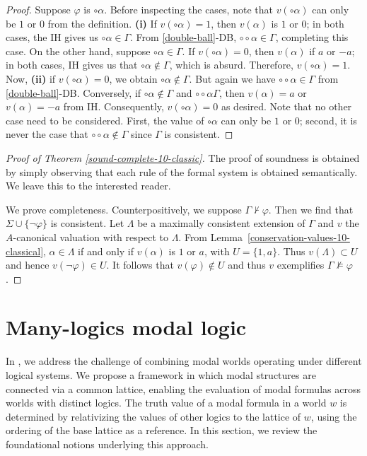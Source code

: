\documentclass{amsart}
\begin{document}
\begin{proof}
    Suppose $\varphi$ is $\circ \alpha$. Before inspecting the cases, note that $v(\circ \alpha)$ can only be $1$ or $0$ from the definition.
    \textbf{(i)} If $v(\circ \alpha) = 1$, then $v(\alpha)$ is $1$ or $0$; in both cases, the IH gives us $\circ \alpha \in \Gamma$. From \ref{double-ball}-DB, $\circ \circ \alpha \in \Gamma$, completing this case. On the other hand, suppose $\circ \alpha \in \Gamma$. If $v(\circ \alpha) = 0$, then $v(\alpha)$ if $a$ or $-a$; in both cases, IH gives us that $\circ \alpha \notin \Gamma$, which is absurd. Therefore, $v(\circ \alpha) = 1$. Now, \textbf{(ii)} if $v(\circ \alpha) = 0$, we obtain $\circ \alpha \notin \Gamma$. But again we have $\circ \circ \alpha \in \Gamma$ from \ref{double-ball}-DB. Conversely, if $\circ \alpha \notin \Gamma$ and $\circ \circ \alpha \Gamma$, then $v(\alpha) = a$ or $v(\alpha) = -a$ from IH. Consequently, $v(\circ \alpha) = 0$ as desired. Note that no other case need to be considered. First, the value of $\circ \alpha$ can only be $1$ or $0$; second, it is never the case that $\circ \circ \alpha \notin \Gamma$ since $\Gamma$ is consistent.
\end{proof}

\begin{proof}[Proof of Theorem \ref{sound-complete-10-classic}]
    The proof of soundness is obtained by simply observing that each rule of the formal system is obtained semantically. We leave this to the interested reader.
    
    We prove completeness. Counterpositively, we suppose $\Gamma \nvdash \varphi$. Then we find that $\Sigma \cup \{\lnot \varphi\}$ is consistent. Let $\Lambda$ be a maximally consistent extension of $\Gamma$ and $v$ the $A$-canonical valuation with respect to $\Lambda$. From Lemma~\ref{conservation-values-10-classical}, $\alpha \in \Lambda$ if and only if $v(\alpha)$ is $1$ or $a$, with $U = \{1, a\}$. Thus $v(\Lambda) \subset U$ and hence $v(\lnot \varphi) \in U$. It follows that $v(\varphi) \notin U$ and thus $v$ exemplifies $\Gamma \nvDash \varphi$.
    
\end{proof}

\section{Many-logics modal logic}\label{MLML}

In \cite{freire_modality_2024}, we address the challenge of combining modal worlds operating under different logical systems. We propose a framework in which modal structures are connected via a common lattice, enabling the evaluation of modal formulas across worlds with distinct logics. The truth value of a modal formula in a world $w$ is determined by relativizing the values of other logics to the lattice of $w$, using the ordering of the base lattice as a reference. In this section, we review the foundational notions underlying this approach.
\end{document}
